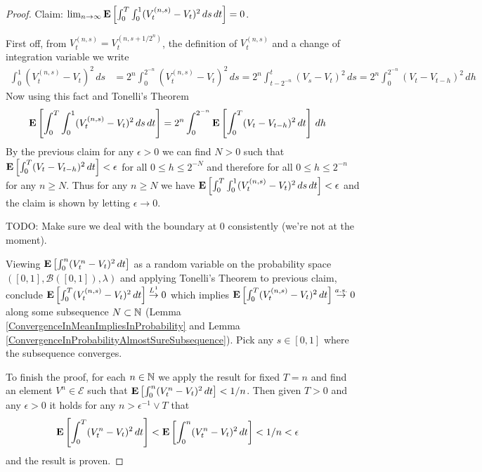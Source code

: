 \begin{proof}
Claim: $\lim_{n \to \infty } \textbf{E}\left[\int_0^T \int_0^1 (V^{(n,s)}_t - V_t)^2 \, ds \, dt\right] = 0$.

First off, from $V^{(n,s)}_t = V^{(n, s+1/2^n)}_t$, the definition of $V^{(n,s)}_t$ and a change of integration variable we write
\begin{align*}
\int_0^1 (V^{(n,s)}_t - V_t)^2 \, ds &= 2^n \int_0^{2^{-n}}  (V^{(n,s)}_t - V_t)^2 \, ds = 2^n \int_{t-2^{-n}}^t  (V_s - V_t)^2 \, ds = 2^n \int_0^{2^{-n}}  (V_t - V_{t - h})^2 \, dh
\end{align*}
Now using this fact and Tonelli's Theorem
\begin{align*}
\textbf{E}\left[\int_0^T \int_0^1 (V^{(n,s)}_t - V_t)^2 \, ds \, dt\right]  &= 2^n \int_0^{2^{-n}} \textbf{E}\left[\int_0^T (V_t - V_{t -h})^2 \, dt\right]  \, dh
\end{align*}
By the previous claim for any $\epsilon > 0$ we can find $N>0$ such that $\textbf{E}\left[\int_0^T (V_t - V_{t -h})^2 \, dt\right] < \epsilon$ for all $0 \leq h \leq 2^{-N}$ and therefore for all $0 \leq h \leq 2^{-n}$ for any $n \geq N$.  Thus for any $n \geq N$ we have $\textbf{E}\left[\int_0^T \int_0^1 (V^{(n,s)}_t - V_t)^2 \, ds \, dt\right] < \epsilon$ and the claim is shown by letting $\epsilon \to 0$.

TODO: Make sure we deal with the boundary at $0$ consistently (we're not at the moment).

Viewing $\textbf{E}\left[\int_0^n (V^{n}_t - V_t)^2 \, dt\right]$ as a random variable on the probability space $([0,1], \mathcal{B}([0,1]), \lambda)$  and applying Tonelli's Theorem to previous claim, conclude $\textbf{E}\left[\int_0^T (V^{(n,s)}_t - V_t)^2 \, dt\right] \overset{L^1}\to 0$ which implies $\textbf{E}\left[\int_0^T (V^{(n,s)}_t - V_t)^2 \, dt\right] \overset{a.s.}\to 0$ along some subsequence $N \subset \mathbb{N}$ (Lemma \ref{ConvergenceInMeanImpliesInProbability}  and Lemma \ref{ConvergenceInProbabilityAlmostSureSubsequence}).  Pick any $s \in [0,1]$ where the subsequence converges.

To finish the proof, for each $n \in \mathbb{N}$ we apply the result for fixed $T=n$ and find an element $V^n \in \mathcal{E}$ such that $\textbf{E}\left[\int_0^n (V^{n}_t - V_t)^2 \, dt\right] < 1/n$.  Then given $T > 0$ and any $\epsilon > 0$ it holds for any $n > \epsilon^{-1} \vee T$ that 
\begin{align*}
\textbf{E}\left[\int_0^T (V^{n}_t - V_t)^2 \, dt\right] &< \textbf{E}\left[\int_0^n (V^{n}_t - V_t)^2 \, dt\right] < 1/n < \epsilon
\end{align*}
and the result is proven.
\end{proof}

